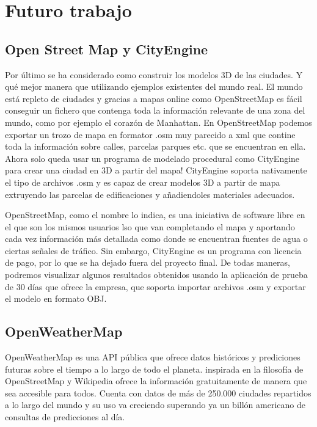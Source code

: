 \documentclass[12pt,a4paper,openright,oneside]{article}
\numberwithin{equation}{section}
\theoremstyle{definition}
\begin{document}
\newpage



\section{Futuro trabajo}

\subsection{Open Street Map y CityEngine}
Por último se ha considerado como construir los modelos 3D de las ciudades. Y qué mejor manera que utilizando ejemplos existentes del mundo real. El mundo está repleto de ciudades y gracias a mapas online como OpenStreetMap es fácil conseguir un fichero que contenga toda la información relevante de una zona del mundo, como por ejemplo el corazón de Manhattan. En OpenStreetMap podemos exportar un trozo de mapa en formator .osm muy parecido a xml que contine toda la información sobre calles, parcelas parques etc. que se encuentran en ella. Ahora solo queda usar un programa de modelado procedural como CityEngine para crear una ciudad en 3D a partir del mapa! CityEngine soporta nativamente el tipo de archivos .osm y es capaz de crear modelos 3D a partir de mapa extruyendo las parcelas de edificaciones y añadiendoles materiales adecuados. 

OpenStreetMap, como el nombre lo indica, es una iniciativa de software libre en el que son los mismos usuarios lso que van completando el mapa y aportando cada vez información más detallada como donde se encuentran fuentes de agua o ciertas señales de tráfico. Sin embargo, CityEngine es un programa con licencia de pago, por lo que se ha dejado fuera del proyecto final. De todas maneras, podremos visualizar algunos resultados obtenidos usando la aplicación de prueba de 30 días que ofrece la empresa, que soporta importar archivos .osm y exportar el modelo en formato OBJ.


\subsection{OpenWeatherMap}
OpenWeatherMap es una API pública que ofrece datos históricos y prediciones futuras sobre el tiempo a lo largo de todo el planeta. inspirada en la filosofía de OpenStreetMap y Wikipedia ofrece la información gratuitamente de manera que sea accesible para todos. Cuenta con datos de más de 250.000 ciudades repartidos a lo largo del mundo y su uso va creciendo superando ya un billón americano de consultas de predicciones al día.
\end{document}
